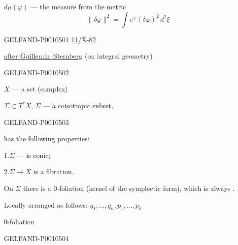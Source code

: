 $d\mu(\varphi)$ — the measure from the metric
\begin{equation*}
\|\delta\varphi\|^2=\int e^{\varphi}(\delta\varphi)^2\,d^2\xi
\tag{13}
\end{equation*}


\begin{GelfandAdjacentEvidence}{GELFAND-P001050}{1}
\underline{11/$\overline{\underline{\mathrm{X}}}$-82 {}}\qquad
{}


\underline{after Guillemin–Sternberg} (on integral geometry)
\end{GelfandAdjacentEvidence}
\begin{GelfandAdjacentEvidence}{GELFAND-P001050}{2}


$X$ — a set (complex)

$\Sigma\subset T^*X$, $\Sigma$ — a coisotropic subset,
\end{GelfandAdjacentEvidence}
\begin{GelfandAdjacentEvidence}{GELFAND-P001050}{3}

has the following properties:

1.\quad $\Sigma$ — is conic;

2.\quad $\Sigma\to X$ is a fibration.

On $\Sigma$ there is a $0$-foliation (kernel of the symplectic form), which is always .

Locally arranged as follows: $q_1,\ldots,q_n,p_1,\ldots,p_k$

$0$-foliation
\end{GelfandAdjacentEvidence}
\begin{GelfandAdjacentEvidence}{GELFAND-P001050}{4}


\end{GelfandAdjacentEvidence}
